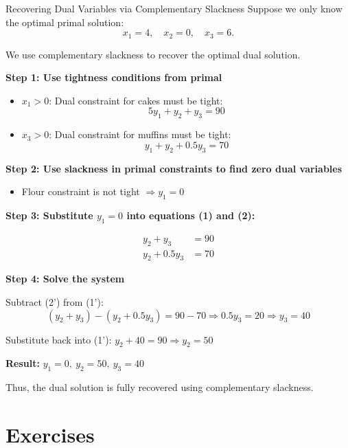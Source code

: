 \begin{example}{Recovering Dual Variables via Complementary Slackness}
Suppose we only know the optimal primal solution:
\[
x_1 = 4,\quad x_2 = 0,\quad x_3 = 6.
\]

We use complementary slackness to recover the optimal dual solution.

\textbf{Step 1: Use tightness conditions from primal}

\begin{itemize}
\item \(x_1 > 0\): Dual constraint for cakes must be tight:
\[
5y_1 + y_2 + y_3 = 90 \tag{1}
\]
\item \(x_3 > 0\): Dual constraint for muffins must be tight:
\[
y_1 + y_2 + 0.5y_3 = 70 \tag{2}
\]
\end{itemize}

\textbf{Step 2: Use slackness in primal constraints to find zero dual variables}

\begin{itemize}
\item Flour constraint is not tight \( \Rightarrow y_1 = 0 \)
\end{itemize}

\textbf{Step 3: Substitute \(y_1 = 0\) into equations (1) and (2):}

\begin{align*}
y_2 + y_3 &= 90 \tag{1'} \\
y_2 + 0.5y_3 &= 70 \tag{2'}
\end{align*}

\textbf{Step 4: Solve the system}

Subtract (2') from (1'):
\[
(y_2 + y_3) - (y_2 + 0.5y_3) = 90 - 70 \Rightarrow 0.5y_3 = 20 \Rightarrow y_3 = 40
\]

Substitute back into (1'): \( y_2 + 40 = 90 \Rightarrow y_2 = 50 \)

\textbf{Result: } \( y_1 = 0,\ y_2 = 50,\ y_3 = 40 \)

Thus, the dual solution is fully recovered using complementary slackness.
\end{example}

\section{Exercises}



